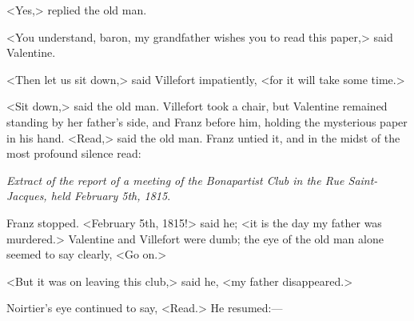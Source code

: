  <Yes,> replied the old man. 

 <You understand, baron, my grandfather wishes you to read this paper,> said Valentine. 

 <Then let us sit down,> said Villefort impatiently, <for it will take some time.> 

 <Sit down,> said the old man. Villefort took a chair, but Valentine remained standing by her father's side, and Franz before him, holding the mysterious paper in his hand. <Read,> said the old man. Franz untied it, and in the midst of the most profound silence read: 
 
\begin{center} 
 \textit{Extract of the report of a meeting of the Bonapartist Club in the Rue Saint-Jacques, held February 5th, 1815}. 
\end{center}
 Franz stopped. <February 5th, 1815!> said he; <it is the day my father was murdered.> Valentine and Villefort were dumb; the eye of the old man alone seemed to say clearly, <Go on.> 

 <But it was on leaving this club,> said he, <my father disappeared.> 

 Noirtier's eye continued to say, <Read.> He resumed:— 

